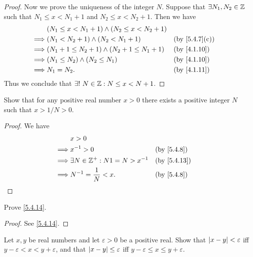 \begin{proof}
  Now we prove the uniqueness of the integer \(N\).
  Suppose that \(\exists N_1, N_2 \in \mathbb{Z}\) such that \(N_1 \leq x < N_1 + 1\) and \(N_2 \leq x < N_2 + 1\).
  Then we have
  \begin{align*}
             & (N_1 \leq x < N_1 + 1) \land (N_2 \leq x < N_2 + 1)                    \\
    \implies & (N_1 < N_2 + 1) \land (N_2 < N_1 + 1)               &  & \by{5.4.7}[c] \\
    \implies & (N_1 + 1 \leq N_2 + 1) \land (N_2 + 1 \leq N_1 + 1) &  & \by{4.1.10}   \\
    \implies & (N_1 \leq N_2) \land (N_2 \leq N_1)                 &  & \by{4.1.10}   \\
    \implies & N_1 = N_2.                                          &  & \by{4.1.11}
  \end{align*}
  Thus we conclude that \(\exists!\ N \in \mathbb{Z} : N \leq x < N + 1\).
\end{proof}

\begin{ex}\label{ex:5.4.4}
  Show that for any positive real number \(x > 0\) there exists a positive integer \(N\) such that \(x > 1 / N > 0\).
\end{ex}

\begin{proof}
  We have
  \begin{align*}
             & x > 0                                                 \\
    \implies & x^{-1} > 0                           &  & \by{5.4.8}  \\
    \implies & \exists N \in \Z^+ : N1 = N > x^{-1} &  & \by{5.4.13} \\
    \implies & N^{-1} = \dfrac{1}{N} < x.           &  & \by{5.4.8}
  \end{align*}
\end{proof}

\begin{ex}\label{ex:5.4.5}
  Prove \cref{5.4.14}.
\end{ex}

\begin{proof}
  See \cref{5.4.14}.
\end{proof}

\begin{ex}\label{ex:5.4.6}
  Let \(x, y\) be real numbers and let \(\varepsilon > 0\) be a positive real.
  Show that \(\left\lvert x - y\right\rvert < \varepsilon\) iff \(y - \varepsilon < x < y + \varepsilon\), and that \(\left\lvert x - y\right\rvert \leq \varepsilon\) iff \(y - \varepsilon \leq x \leq y + \varepsilon\).
\end{ex}

